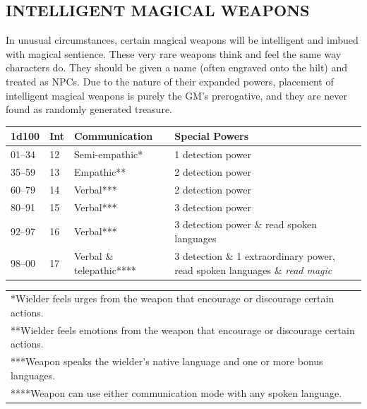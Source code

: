\begin{multicols}{2}
\begin{center}
\end{center}

\subsection{INTELLIGENT MAGICAL WEAPONS}

In unusual circumstances, certain magical weapons will be intelligent and imbued with magical sentience.  These very rare weapons think and feel the same way characters do.  They should be given a name (often engraved onto the hilt) and treated as NPCs.  Due to the nature of their expanded powers, placement of intelligent magical weapons is purely the GM's prerogative, and they are never found as randomly generated treasure.  

\end{multicols}

\noindent \begin{minipage}{\columnwidth}

\label{weaponint}
\noindent \begin{tabular}{|p{}|p{}|p{}|p{}|}
\hline
1d100	& Int	& Communication	& Special Powers \\
\hline\hline
\rowcolor[gray]{0.9}01--34	& 12	& Semi-empathic*	& 1 detection power \\
35--59	& 13	& Empathic**	& 2 detection power \\
\rowcolor[gray]{0.9}60--79	& 14	& Verbal***	& 2 detection power \\
80--91	& 15	& Verbal***	& 3 detection power \\
\rowcolor[gray]{0.9}92--97	& 16	& Verbal***	& 3 detection power \& read spoken languages \\
98--00	& 17	& Verbal \& telepathic****	& 3 detection \& 1 extraordinary power, read spoken languages \& \textit{read magic} \\
\hline
\end{tabular}
\noindent\begin{tabular}{p{}}
*Wielder feels urges from the weapon that encourage or discourage certain actions. \\
**Wielder feels emotions from the weapon that encourage or discourage certain actions. \\
***Weapon speaks the wielder's native language and one or more bonus languages. \\
****Weapon can use either communication mode with any spoken language. \\
\end{tabular}\vspace{.5em}

\end{minipage}

